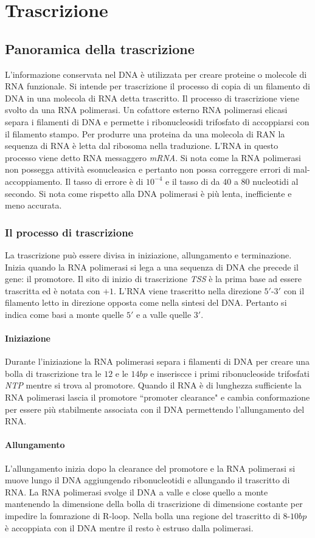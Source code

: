 \chapter{Trascrizione}
\section{Panoramica della trascrizione}
L'informazione conservata nel DNA \`e utilizzata per creare proteine o molecole di RNA funzionale. Si intende per trascrizione il processo di copia di un filamento di DNA in una molecola
di RNA detta trascritto. Il processo di trascrizione viene svolto da una RNA polimerasi. Un cofattore esterno RNA polimerasi elicasi separa i filamenti di DNA e permette i 
ribonucleosidi trifosfato di accoppiarsi con il filamento stampo. Per produrre una proteina da una molecola di RAN la sequenza di RNA \`e letta dal ribosoma nella traduzione. L'RNA
in questo processo viene detto RNA messaggero \emph{mRNA}. Si nota come la RNA polimerasi non possegga attivit\`a esonucleasica e pertanto non possa correggere errori di 
mal-accoppiamento. Il tasso di errore \`e di $10^{-4}$ e il tasso di da $40$ a $80$ nucleotidi al secondo. Si nota come rispetto alla DNA polimerasi \`e pi\`u lenta, inefficiente e 
meno accurata. 
\subsection{Il processo di trascrizione}
La trascrizione pu\`o essere divisa in iniziazione, allungamento e terminazione. Inizia quando la RNA polimerasi si lega a una sequenza di DNA che precede il gene: il promotore. Il 
sito di inizio di trascrizione \emph{TSS} \`e la prima base ad essere trascritta ed \`e notata con $+1$. L'RNA viene trascritto nella direzione $5'$-$3'$ con il filamento letto in 
direzione opposta come nella sintesi del DNA. Pertanto si indica come basi a monte quelle $5'$ e a valle quelle $3'$. 
\subsubsection{Iniziazione}
Durante l'iniziazione la RNA polimerasi separa i filamenti di DNA per creare una bolla di trascrizione tra le $12$ e le $14bp$ e inseriscce i primi ribonucleoside trifosfati \emph{NTP} 
mentre si trova al promotore. 	Quando il RNA \`e di lunghezza sufficiente la RNA polimerasi lascia il promotore ``promoter clearance" e cambia conformazione per essere pi\`u 
stabilmente associata con il DNA permettendo l'allungamento del RNA. 
\subsubsection{Allungamento}
L'allungamento inizia dopo la clearance del promotore e la RNA polimerasi si muove lungo il DNA aggiungendo ribonucleotidi e allungando il trascritto di RNA. La RNA polimerasi 
svolge il DNA a valle e close quello a monte mantenendo la dimensione della bolla di trascrizione di dimensione costante per impedire la fomrazione di R-loop. Nella bolla una
regione del trascritto di $8$-$10bp$ \`e accoppiata con il DNA mentre il resto \`e estruso dalla polimerasi.
